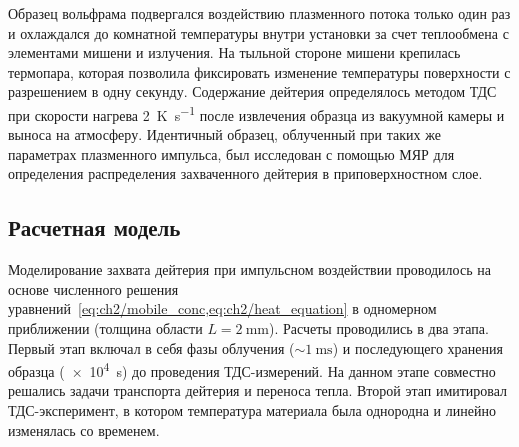 Образец вольфрама подвергался воздействию плазменного потока только один раз и охлаждался до комнатной температуры внутри установки за счет теплообмена с элементами мишени и излучения. На тыльной стороне мишени крепилась термопара, которая позволила фиксировать изменение температуры поверхности с разрешением в одну секунду. Содержание дейтерия определялось методом ТДС при скорости нагрева \SI{2}{\kelvin\per\second} после извлечения образца из вакуумной камеры и выноса на атмосферу. Идентичный образец, облученный при таких же параметрах плазменного импульса, был исследован с помощью МЯР для определения распределения захваченного дейтерия в приповерхностном слое.

\subsection{Расчетная модель}\label{sec:ch3/sec1/subsec2}
Моделирование захвата дейтерия при импульсном воздействии проводилось на основе численного решения уравнений~\cref{eq:ch2/mobile_conc,eq:ch2/heat_equation} в одномерном приближении (толщина области \( L=\SI{2}{\milli\meter} \)). Расчеты проводились в два этапа. Первый этап включал в себя фазы облучения (\(\sim \SI{1}{\milli\second}\)) и последующего хранения образца (\SI{e4}{\second}) до проведения ТДС-измерений. На данном этапе совместно решались задачи транспорта дейтерия и переноса тепла. Второй этап имитировал ТДС-эксперимент, в котором температура материала была однородна и линейно изменялась со временем.

